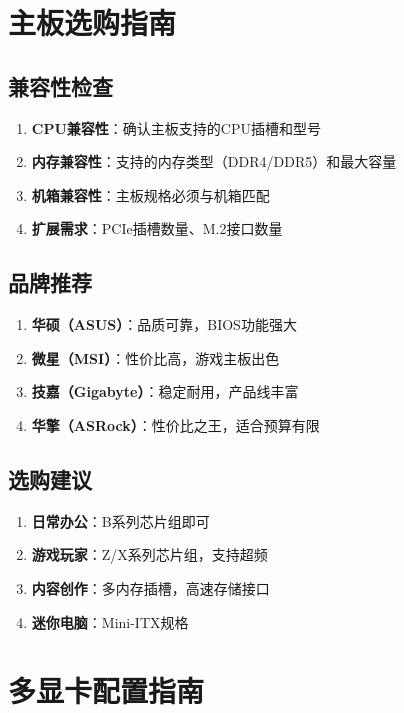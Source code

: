 \documentclass[12pt,UTF8]{ctexbook}
\begin{document}
\chapter{主板选购指南}

\section{兼容性检查}

\begin{enumerate}
    \item \textbf{CPU兼容性}：确认主板支持的CPU插槽和型号
    \item \textbf{内存兼容性}：支持的内存类型（DDR4/DDR5）和最大容量
    \item \textbf{机箱兼容性}：主板规格必须与机箱匹配
    \item \textbf{扩展需求}：PCIe插槽数量、M.2接口数量
\end{enumerate}

\section{品牌推荐}

\begin{enumerate}
    \item \textbf{华硕（ASUS）}：品质可靠，BIOS功能强大
    \item \textbf{微星（MSI）}：性价比高，游戏主板出色
    \item \textbf{技嘉（Gigabyte）}：稳定耐用，产品线丰富
    \item \textbf{华擎（ASRock）}：性价比之王，适合预算有限
\end{enumerate}

\section{选购建议}

\begin{enumerate}
    \item \textbf{日常办公}：B系列芯片组即可
    \item \textbf{游戏玩家}：Z/X系列芯片组，支持超频
    \item \textbf{内容创作}：多内存插槽，高速存储接口
    \item \textbf{迷你电脑}：Mini-ITX规格
\end{enumerate}

\chapter{多显卡配置指南}
\end{document}

